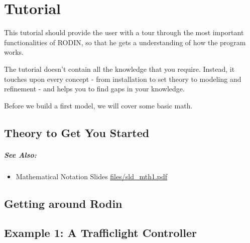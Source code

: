 \chapter{Tutorial}
\label{tutorial}

This tutorial should provide the user with a tour through the most important functionalities of RODIN, so that he gets a understanding of how the program works.

The tutorial doesn't contain all the knowledge that you require.  Instead, it touches upon every concept - from installation to set theory to modeling and refinement - and helps you to find gaps in your knowledge.

Before we build a first model, we will cover some basic math.

\section{Theory to Get You Started}
\label{tutorial_theory}


\paragraph{See Also:}
\begin{itemize}
\item Mathematical Notation Slides \url{files/sld_mth1.pdf}
\end{itemize}


\section{Getting around Rodin}
\label{tutorial_2}



\section{Example 1: A Trafficlight Controller}
\label{tutorial_3}


